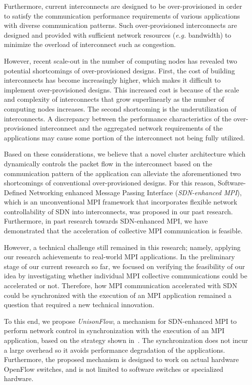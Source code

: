 Furthermore, current interconnects are designed to be over-provisioned
in order to satisfy the communication performance requirements of
various applications with diverse communication patterns. Such
over-provisioned interconnects are designed and provided with sufficient
network resources (\emph{e.g.} bandwidth) to minimize the overload of
interconnect such as congestion.

However, recent scale-out in the number of computing nodes has revealed
two potential shortcomings of over-provisioned designs. First, the cost
of building interconnects has become increasingly higher, which makes it
difficult to implement over-provisioned designs. This increased cost is
because of the scale and complexity of interconnects that grow
superlinearly as the number of computing nodes increases. The second
shortcoming is the underutilization of interconnects. A discrepancy
between the performance characteristics of the over-provisioned
interconnect and the aggregated network requirements of the applications
may cause some portion of the interconnect not being fully utilized.

Based on these considerations, we believe that a novel cluster
architecture which dynamically controls the packet flow in the
interconnect based on the communication pattern of the application can
alleviate the aforementioned two shortcomings of conventional
over-provisioned designs. For this reason, Software-Defined Networking
enhanced Message Passing Interface (\emph{SDN-enhanced MPI}), which is
an unconventional MPI framework that incorporates flexible network
controllability of SDN into interconnects, was proposed in our past
research. Furthermore, in past research towards SDN-enhanced MPI, we
have demonstrated that the acceleration of collective MPI communication
is feasible.

However, a technical challenge still remained in this research; namely,
applying our research achievements to real-world MPI applications. In
the preliminary stage of our current research so far, we focused on
verifying the feasibility of our idea by investigating whether
individual MPI collective communications could be accelerated or not.
Therefore, how MPI communication accelerated with SDN could be
synchronized with the execution of an MPI application remained a
question that required a new technical innovation.

To this end, we propose \emph{UnisonFlow}, a mechanism for SDN-enhanced
MPI to perform network control in synchronization with the execution of
an MPI application, based on the strategy shown
in~\autocite{Takahashi2015}. The synchronization does not incur a large
overhead so it avoids performance degradation of the applications.
Furthermore, the proposed mechanism is designed to work on actual
hardware OpenFlow switches, and is not limited to software switches or
specialized hardware.

